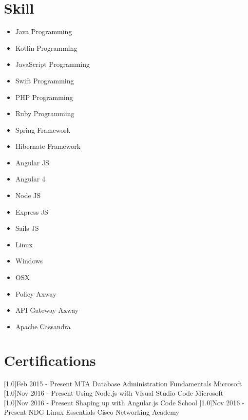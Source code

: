 \documentclass[english]{cv-style}
\begin{document}
\section{Skill}
\vspace{-0.3cm}
\begin{itemize}
\item Java Programming
\item Kotlin Programming
\item JavaScript Programming
\item Swift Programming
\item PHP Programming
\item Ruby Programming
\item Spring Framework
\item Hibernate Framework
\item Angular JS
\item Angular 4
\item Node JS
\item Express JS
\item Sails JS
\item Linux
\item Windows
\item OSX
\item Policy Axway
\item API Gateway Axway
\item Apache Cassandra
\end{itemize}
\section{Certifications}
\vspace{-0.3cm}
\begin{entrylist}
\entry
{\scalebox{.8}[1.0]{Feb 2015 - Present}}
{MTA Database Administration Fundamentals}
{Microsoft}
{}
\entry
{\scalebox{.8}[1.0]{Nov 2016 - Present}}
{Using Node.js with Visual Studio Code}
{Microsoft}
{}
\entry
{\scalebox{.8}[1.0]{Nov 2016 - Present}}
{Shaping up with Angular.js}
{Code School}
{}
\entry
{\scalebox{.8}[1.0]{Nov 2016 - Present}}
{NDG Linux Essentials}
{Cisco Networking Academy}
{}
\end{entrylist}
\end{document}
